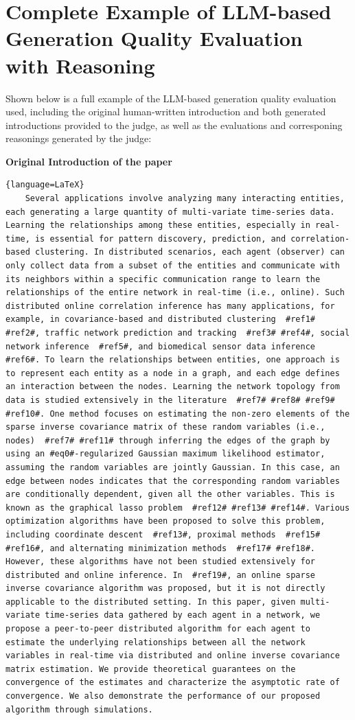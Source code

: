 \section{Complete Example of LLM-based Generation Quality Evaluation with Reasoning}\label{generation-evaluation-example}
Shown below is a full example of the LLM-based generation quality evaluation used, including the original human-written introduction and both generated introductions provided to the judge, as well as the evaluations and corresponing reasonings generated by the judge:

\textbf{Original Introduction of the paper}
\begin{lstlisting}{language=LaTeX}
    Several applications involve analyzing many interacting entities, each generating a large quantity of multi-variate time-series data. Learning the relationships among these entities, especially in real-time, is essential for pattern discovery, prediction, and correlation-based clustering. In distributed scenarios, each agent (observer) can only collect data from a subset of the entities and communicate with its neighbors within a specific communication range to learn the relationships of the entire network in real-time (i.e., online). Such distributed online correlation inference has many applications, for example, in covariance-based and distributed clustering  #ref1# #ref2#, traffic network prediction and tracking  #ref3# #ref4#, social network inference  #ref5#, and biomedical sensor data inference  #ref6#. To learn the relationships between entities, one approach is to represent each entity as a node in a graph, and each edge defines an interaction between the nodes. Learning the network topology from data is studied extensively in the literature  #ref7# #ref8# #ref9# #ref10#. One method focuses on estimating the non-zero elements of the sparse inverse covariance matrix of these random variables (i.e., nodes)  #ref7# #ref11# through inferring the edges of the graph by using an #eq0#-regularized Gaussian maximum likelihood estimator, assuming the random variables are jointly Gaussian. In this case, an edge between nodes indicates that the corresponding random variables are conditionally dependent, given all the other variables. This is known as the graphical lasso problem  #ref12# #ref13# #ref14#. Various optimization algorithms have been proposed to solve this problem, including coordinate descent  #ref13#, proximal methods  #ref15# #ref16#, and alternating minimization methods  #ref17# #ref18#. However, these algorithms have not been studied extensively for distributed and online inference. In  #ref19#, an online sparse inverse covariance algorithm was proposed, but it is not directly applicable to the distributed setting. In this paper, given multi-variate time-series data gathered by each agent in a network, we propose a peer-to-peer distributed algorithm for each agent to estimate the underlying relationships between all the network variables in real-time via distributed and online inverse covariance matrix estimation. We provide theoretical guarantees on the convergence of the estimates and characterize the asymptotic rate of convergence. We also demonstrate the performance of our proposed algorithm through simulations.
\end{lstlisting}

